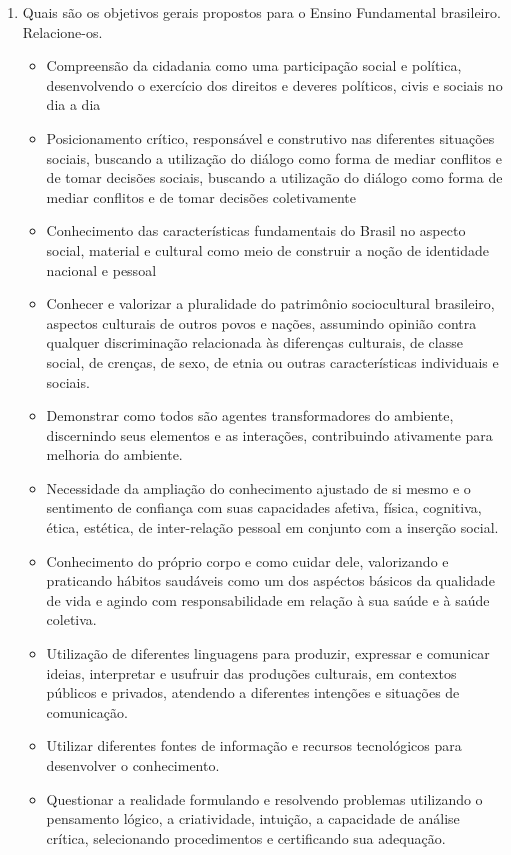 \documentclass[a4paper, 12pt]{article}
\begin{document}
\begin{enumerate}
\item Quais são os objetivos gerais propostos para o Ensino Fundamental brasileiro. Relacione-os. \\
  \begin{itemize}
  \item Compreensão da cidadania como uma participação social e política, desenvolvendo o exercício dos direitos e deveres políticos, civis e sociais no dia a dia
  \item Posicionamento crítico, responsável e construtivo nas diferentes situações sociais, buscando a utilização do diálogo como forma de mediar conflitos e de tomar decisões sociais, buscando a utilização do diálogo como forma de mediar conflitos e de tomar decisões coletivamente
  \item Conhecimento das características fundamentais do Brasil no aspecto social, material e cultural como meio de construir a noção de identidade nacional e pessoal
  \item Conhecer e valorizar a pluralidade do patrimônio sociocultural brasileiro, aspectos culturais de outros povos e nações, assumindo opinião contra qualquer discriminação relacionada às diferenças culturais, de classe social, de crenças, de sexo, de etnia ou outras características individuais e sociais.
  \item Demonstrar como todos são agentes transformadores do ambiente, discernindo seus elementos e as interações, contribuindo ativamente para melhoria do ambiente.
  \item Necessidade da ampliação do conhecimento ajustado de si mesmo e o sentimento de confiança com suas capacidades afetiva, física, cognitiva, ética, estética, de inter-relação pessoal em conjunto com a inserção social.
  \item Conhecimento do próprio corpo e como cuidar dele, valorizando e praticando hábitos saudáveis como um dos aspéctos básicos da qualidade de vida e agindo com responsabilidade em relação à sua saúde e à saúde coletiva.
  \item Utilização de diferentes linguagens para produzir, expressar e comunicar ideias, interpretar e usufruir das produções culturais, em contextos públicos e privados, atendendo a diferentes intenções e situações de comunicação.
  \item Utilizar diferentes fontes de informação e recursos tecnológicos para desenvolver o conhecimento.
  \item Questionar a realidade formulando e resolvendo problemas utilizando o pensamento lógico, a criatividade, intuição, a capacidade de análise crítica, selecionando procedimentos e certificando sua adequação.    

\end{itemize}
\end{enumerate}
\end{document}
